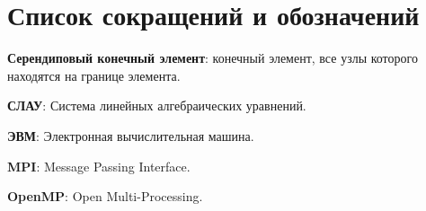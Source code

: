 \chapter*{Список сокращений и обозначений}             %

\textbf{Серендиповый конечный элемент}: конечный элемент, все узлы которого находятся на границе элемента.

\textbf{СЛАУ}: Система линейных алгебраических уравнений.

\textbf{ЭВМ}: Электронная вычислительная машина.

\textbf{MPI}: Message Passing Interface.

\textbf{OpenMP}: Open Multi-Processing.